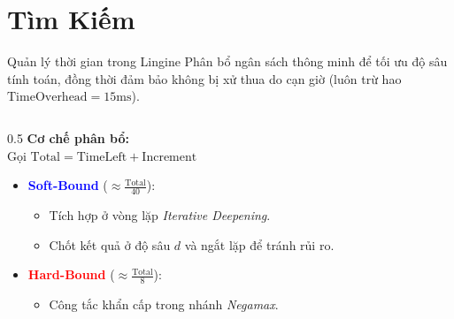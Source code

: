 \section{Tìm Kiếm}


\begin{frame}{Quản lý thời gian trong Lingine}
  \vspace{-0.5cm}
    Phân bổ ngân sách thông minh để tối ưu độ sâu tính toán, đồng thời đảm bảo không bị xử thua do cạn giờ (luôn trừ hao $\text{TimeOverhead} = 15\text{ms}$).
    
    \begin{columns}[T]
        \begin{column}{0.5\textwidth}
            \textbf{Cơ chế phân bổ:} \\
            Gọi $\text{Total} = \text{TimeLeft} + \text{Increment}$
            
            \begin{itemize}
                \item<2-> \textcolor{blue}{\textbf{Soft-Bound}} ($\approx \frac{\text{Total}}{40}$): 
                \begin{itemize}
                    \item Tích hợp ở vòng lặp \textit{Iterative Deepening}.
                    \item Chốt kết quả ở độ sâu $d$ và ngắt lặp để tránh rủi ro.
                \end{itemize}
                
                \item<3-> \textcolor{red}{\textbf{Hard-Bound}} ($\approx \frac{\text{Total}}{8}$):
                \begin{itemize}
                    \item Công tắc khẩn cấp trong nhánh \textit{Negamax}.
                \end{itemize}
            \end{itemize}
        \end{column}
        

\end{columns}
\end{frame}
